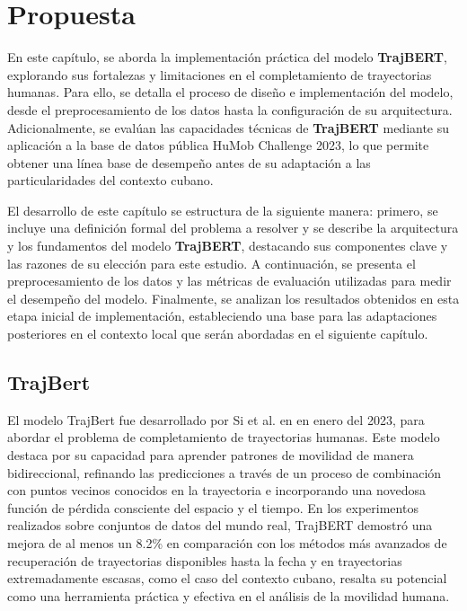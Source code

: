 \chapter{Propuesta}\label{chapter:proposal}

En este capítulo, se aborda la implementación práctica del modelo \textbf{TrajBERT}, explorando sus fortalezas y limitaciones en el completamiento de trayectorias humanas. Para ello, se detalla el proceso de diseño e implementación del modelo, desde el preprocesamiento de los datos hasta la configuración de su arquitectura. Adicionalmente, se evalúan las capacidades técnicas de \textbf{TrajBERT} mediante su aplicación a la base de datos pública HuMob Challenge 2023, lo que permite obtener una línea base de desempeño antes de su adaptación a las particularidades del contexto cubano.

El desarrollo de este capítulo se estructura de la siguiente manera: primero, se incluye una definición formal del problema a resolver y se describe la arquitectura y los fundamentos del modelo \textbf{TrajBERT}, destacando sus componentes clave y las razones de su elección para este estudio. A continuación, se presenta el preprocesamiento de los datos y las métricas de evaluación utilizadas para medir el desempeño del modelo. Finalmente, se analizan los resultados obtenidos en esta etapa inicial de implementación, estableciendo una base para las adaptaciones posteriores en el contexto local que serán abordadas en el siguiente capítulo.

\section{TrajBert}

El modelo TrajBert fue desarrollado por Si et al. en \cite{si2023trajbert} en enero del 2023, para abordar el problema de completamiento de trayectorias humanas. Este modelo destaca por su capacidad para aprender patrones de movilidad de manera bidireccional, refinando las predicciones a través de un proceso de combinación con puntos vecinos conocidos en la trayectoria e incorporando una novedosa función de pérdida consciente del espacio y el tiempo. En los experimentos realizados sobre conjuntos de datos del mundo real, TrajBERT demostró una mejora de al menos un 8.2\% en comparación con los métodos más avanzados de recuperación de trayectorias disponibles hasta la fecha y en trayectorias extremadamente escasas, como el caso del contexto cubano, resalta su potencial como una herramienta práctica y efectiva en el análisis de la movilidad humana.

